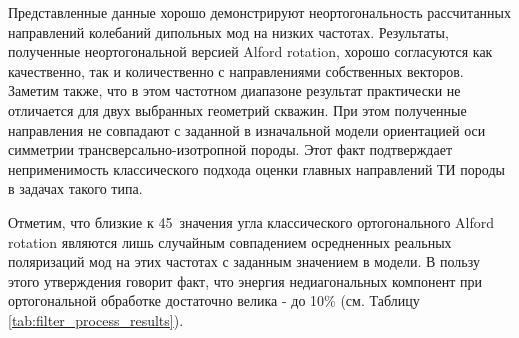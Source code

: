 \documentclass[a4paper,11pt]{article}
\begin{document}

Представленные данные хорошо демонстрируют неортогональность рассчитанных направлений колебаний дипольных мод на низких частотах. Результаты, полученные неортогональной версией Alford rotation, хорошо согласуются как качественно, так и количественно с направлениями собственных векторов. Заметим также, что в этом частотном диапазоне результат практически не отличается для двух выбранных геометрий скважин. При этом полученные направления не совпадают с заданной в изначальной модели ориентацией оси симметрии трансверсально-изотропной породы. Этот факт подтверждает неприменимость классического подхода оценки главных направлений ТИ породы в задачах такого типа. 

Отметим, что близкие к 45\textdegree \ значения угла классического ортогонального Alford rotation являются лишь случайным совпадением осредненных реальных поляризаций мод на этих частотах с заданным значением в модели. В пользу этого утверждения говорит факт, что энергия недиагональных компонент при ортогональной обработке достаточно велика - до 10\% (см. Таблицу \ref{tab:filter_process_results}). 
\end{document}

